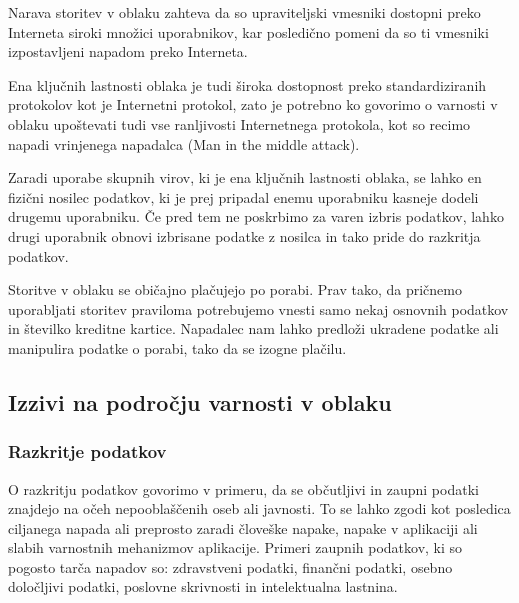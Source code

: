 \documentclass[12pt,a4paper,openany]{book}
\begin{document}
\begin{description}[style=nextline]

\item[Nedovoljen dostop do upraviteljskega in programskega vmesnika] Narava storitev v oblaku zahteva da so upraviteljski vmesniki dostopni preko Interneta siroki množici uporabnikov, kar posledično pomeni da so ti vmesniki izpostavljeni napadom preko Interneta.

\item[Ranljivosti internetnega protokola] Ena ključnih lastnosti oblaka je tudi široka dostopnost preko standardiziranih protokolov kot je Internetni protokol, zato je potrebno ko govorimo o varnosti v oblaku upoštevati tudi vse ranljivosti Internetnega protokola, kot so recimo napadi vrinjenega napadalca (Man in the middle attack).

\item[Ranljivosti obnovitve podatkov] Zaradi uporabe skupnih virov, ki je ena ključnih lastnosti oblaka, se lahko en fizični nosilec podatkov, ki je prej pripadal enemu uporabniku kasneje dodeli drugemu uporabniku. Če pred tem ne poskrbimo za varen izbris podatkov, lahko drugi uporabnik obnovi izbrisane podatke z nosilca in tako pride do razkritja podatkov.

\item[Izogibanje merjenju in plačilu] Storitve v oblaku se običajno plačujejo po porabi. Prav tako, da pričnemo uporabljati storitev praviloma potrebujemo vnesti samo nekaj osnovnih podatkov in številko kreditne kartice. Napadalec nam lahko predloži ukradene podatke ali manipulira podatke o porabi, tako da se izogne plačilu.

\end{description}

\subsection{Izzivi na področju varnosti v oblaku}

\subsubsection{Razkritje podatkov}
O razkritju podatkov govorimo v primeru, da se občutljivi in zaupni podatki znajdejo na očeh nepooblaščenih oseb ali javnosti.  To se lahko zgodi kot posledica ciljanega napada ali preprosto zaradi človeške napake, napake v aplikaciji ali slabih varnostnih mehanizmov aplikacije. Primeri zaupnih podatkov, ki so pogosto tarča napadov so: zdravstveni podatki, finančni podatki, osebno določljivi podatki, poslovne skrivnosti in intelektualna lastnina.
\end{document}
